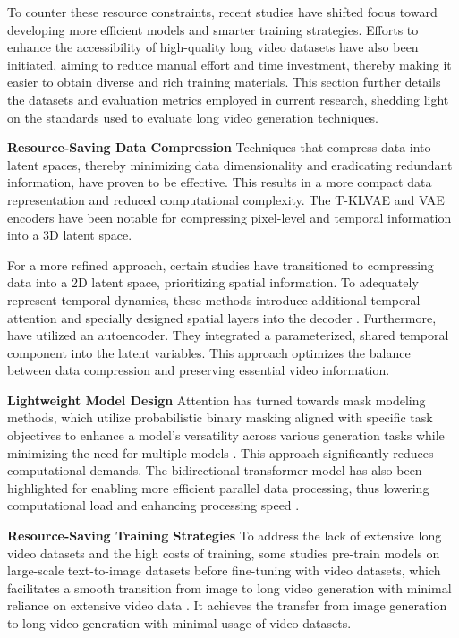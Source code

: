 \documentclass{article}
\begin{document}
To counter these resource constraints, recent studies have shifted focus toward developing more efficient models and smarter training strategies. Efforts to enhance the accessibility of high-quality long video datasets have also been initiated, aiming to reduce manual effort and time investment, thereby making it easier to obtain diverse and rich training materials. This section further details the datasets and evaluation metrics employed in current research, shedding light on the standards used to evaluate long video generation techniques.


\noindent\textbf{Resource-Saving Data Compression}
Techniques that compress data into latent spaces, thereby minimizing data dimensionality and eradicating redundant information, have proven to be effective. This results in a more compact data representation and reduced computational complexity. The T-KLVAE \citep{LGCVD} and VAE encoders \citep{VidRD,NUWA-XL} have been notable for compressing pixel-level and temporal information into a 3D latent space. 

For a more refined approach, certain studies have transitioned to compressing data into a 2D latent space, prioritizing spatial information. To adequately represent temporal dynamics, these methods introduce additional temporal attention and specially designed spatial layers into the decoder \citep{align}. Furthermore, \cite{PVDM} have utilized an autoencoder. They integrated a parameterized, shared temporal component into the latent variables. This approach optimizes the balance between data compression and preserving essential video information.


\noindent\textbf{Lightweight Model Design}
Attention has turned towards mask modeling methods, which utilize probabilistic binary masking aligned with specific task objectives to enhance a model's versatility across various generation tasks while minimizing the need for multiple models \citep{PVDM,seine,RaMViD}. This approach significantly reduces computational demands. The bidirectional transformer model has also been highlighted for enabling more efficient parallel data processing, thus lowering computational load and enhancing processing speed \citep{MeBT}.


\noindent\textbf{Resource-Saving Training Strategies}
To address the lack of extensive long video datasets and the high costs of training, some studies pre-train models on large-scale text-to-image datasets before fine-tuning with video datasets, which facilitates a smooth transition from image to long video generation with minimal reliance on extensive video data \citep{align}. It achieves the transfer from image generation to long video generation with minimal usage of video datasets.
\end{document}
